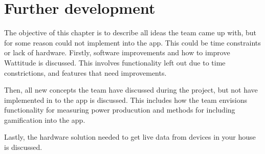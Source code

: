 \chapter{Further development}
\label{sec:further}

The objective of this chapter is to describe all ideas the team came up with, but for some reason could not implement into the app. This could be time constraints or lack of hardware. Firstly, software improvements and how to improve Wattitude is discussed. This involves functionality left out due to time constrictions, and features that need improvements. 

Then, all new concepts the team have discussed during the project, but not have implemented in to the app is discussed. This includes how the team envisions functionality for measuring power producution and methods for including gamification into the app. 

Lastly, the hardware solution needed to get live data from devices in your house is discussed. 




